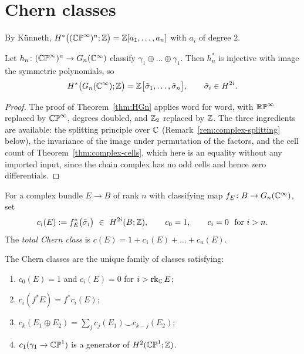 \section{Chern classes}

By K\"unneth, $H^*\big((\mathbb{CP}^\infty)^n;\mathbb{Z}\big)=\mathbb{Z}[a_1,\dots,a_n]$ with $a_i$ of
degree $2$.

\begin{theorem}\label{thm:HGnC}
Let $h_n\colon(\mathbb{CP}^\infty)^n\to G_n(\mathbb{C}^\infty)$ classify
$\gamma_1\oplus\dots\oplus\gamma_1$. Then $h_n^*$ is injective with image the
symmetric polynomials, so
\[
H^*\big(G_n(\mathbb{C}^\infty);\mathbb{Z}\big)=\mathbb{Z}\big[\tilde\sigma_1,\dots,\tilde\sigma_n\big],
\qquad \tilde\sigma_i\in H^{2i}.
\]
\end{theorem}

\begin{proof}
The proof of Theorem~\ref{thm:HGn} applies word for word, with $\mathbb{RP}^\infty$
replaced by $\mathbb{CP}^\infty$, degrees doubled, and $\mathbb{Z}_2$ replaced by $\mathbb{Z}$. The
three ingredients are available: the splitting principle over $\mathbb{C}$
(Remark~\ref{rem:complex-splitting} below), the invariance of the image under
permutation of the factors, and the cell count of
Theorem~\ref{thm:complex-cells}, which here is an equality without any imported
input, since the chain complex has no odd cells and hence zero differentials.
\end{proof}

\begin{definition}
For a complex bundle $E\to B$ of rank $n$ with classifying map
$f_E\colon B\to G_n(\mathbb{C}^\infty)$, set
\[
c_i(E):=f_E^*\big(\tilde\sigma_i\big)\ \in\ H^{2i}(B;\Z),
\qquad c_0=1,\qquad c_i=0\ \text{ for } i>n .
\]
The \emph{total Chern class} is $c(E)=1+c_1(E)+\dots+c_n(E)$.
\end{definition}

\begin{theorem}
The Chern classes are the unique family of classes satisfying:

\begin{enumerate}
\item[(C1)] $c_0(E)=1$ and $c_i(E)=0$ for $i>\operatorname{rk}_{\mathbb{C}} E$;
\item[(C2)] $c_i(f^*E)=f^*c_i(E)$;
\item[(C3)] $c_k(E_1\oplus E_2)=\sum_{j}c_j(E_1)\smile c_{k-j}(E_2)$;
\item[(C4)] $c_1(\gamma_1\to\mathbb{CP}^1)$ is a generator of $H^2(\mathbb{CP}^1;\mathbb{Z})$.
\end{enumerate}
\end{theorem}

